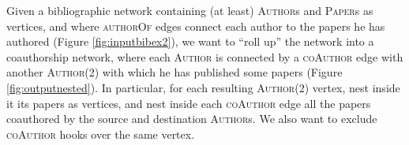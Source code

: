 \begin{example}
	\label{ex:nestingbib}
	Given a bibliographic network containing (at least) \textsc{Author}s and \textsc{Paper}s as vertices, and where \textsc{authorOf} edges connect each author to the papers he has authored (Figure \ref{fig:inputbibex2}), we want to ``roll up'' the network into a coauthorship network, where each \textsc{Author} is connected by a \textsc{coAuthor} edge with another  \textsc{Author}(2) with which he has published some papers (Figure \ref{fig:outputnested}). In particular, for each resulting \textsc{Author}(2) vertex, nest inside it  its papers as vertices, and nest inside each \textsc{coAuthor} edge all the papers coauthored by  the source and destination \textsc{Author}s. We also want to exclude \textsc{coAuthor} hooks over the same vertex.
	

\end{example}
